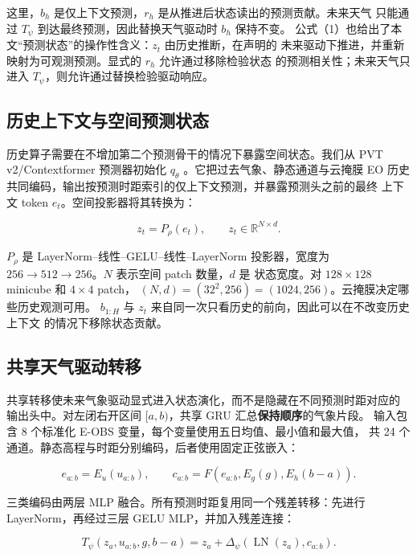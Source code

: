 \documentclass[11pt,a4paper,fontset=fandol]{ctexart}
\begin{document}
这里，$b_h$ 是仅上下文预测，$r_h$ 是从推进后状态读出的预测贡献。未来天气 只能通过 $T_\psi$ 到达最终预测，因此替换天气驱动时 $b_h$ 保持不变。 公式（1）也给出了本文“预测状态”的操作性含义：$z_t$ 由历史推断，在声明的 未来驱动下推进，并重新映射为可观测预测。显式的 $r_h$ 允许通过移除检验状态 的预测相关性；未来天气只进入 $T_\psi$，则允许通过替换检验驱动响应。

\subsection{历史上下文与空间预测状态}

历史算子需要在不增加第二个预测骨干的情况下暴露空间状态。我们从 PVT v2/\allowbreak Contextformer 预测器初始化 $q_\theta$ \cite{wang2022pvtv2,benson2024multimodal}。它把过去气象、静态通道与云掩膜 EO 历史共同编码，输出按预测时距索引的仅上下文预测，并暴露预测头之前的最终 上下文 token $e_t$。空间投影器将其转换为：

\begin{equation*}
z_t=P_\rho(e_t),
\qquad z_t\in\mathbb R^{N\times d}.
\tag{2}
\end{equation*}

$P_\rho$ 是 LayerNorm–线性–GELU–线性–LayerNorm 投影器，宽度为 $256\rightarrow512\rightarrow256$。$N$ 表示空间 patch 数量，$d$ 是 状态宽度。对 $128\times128$ minicube 和 $4\times4$ patch， $(N,d)=(32^2,256)=(1024,256)$。云掩膜决定哪些历史观测可用。 $b_{1:H}$ 与 $z_t$ 来自同一次只看历史的前向，因此可以在不改变历史上下文 的情况下移除状态贡献。

\subsection{共享天气驱动转移}

共享转移使未来气象驱动显式进入状态演化，而不是隐藏在不同预测时距对应的 输出头中。对左闭右开区间 $[a,b)$，共享 GRU 汇总\textbf{保持顺序}的气象片段。 输入包含 8 个标准化 E-OBS 变量，每个变量使用五日均值、最小值和最大值， 共 24 个通道。静态高程与时距分别编码，后者使用固定正弦嵌入：

\begin{equation*}
e_{a:b}=E_u(u_{a:b}),\qquad
c_{a:b}=F\!\left(e_{a:b},E_g(g),E_h(b-a)\right).
\tag{3}
\end{equation*}

三类编码由两层 MLP 融合。所有预测时距复用同一个残差转移：先进行 LayerNorm，再经过三层 GELU MLP，并加入残差连接：

\begin{equation*}
T_\psi(z_a,u_{a:b},g,b-a)
=z_a+\Delta_\psi\!\left(\operatorname{LN}(z_a),c_{a:b}\right).
\tag{4}
\end{equation*}
\end{document}
